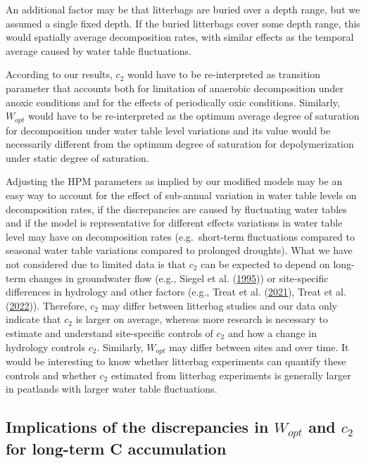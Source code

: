 \documentclass[
  12pt,
]{article}
\begin{document}
An additional factor may be that litterbags are buried over a depth range, but we assumed a single fixed depth. If the buried litterbags cover some depth range, this would spatially average decomposition rates, with similar effects as the temporal average caused by water table fluctuations.

According to our results, \(c_2\) would have to be re-interpreted as transition parameter that accounts both for limitation of anaerobic decomposition under anoxic conditions and for the effects of periodically oxic conditions. Similarly, \(W_{opt}\) would have to be re-interpreted as the optimum average degree of saturation for decomposition under water table level variations and its value would be necessarily different from the optimum degree of saturation for depolymerization under static degree of saturation.

Adjusting the HPM parameters as implied by our modified models may be an easy way to account for the effect of sub-annual variation in water table levels on decomposition rates, if the discrepancies are caused by fluctuating water tables and if the model is representative for different effects variations in water table level may have on decomposition rates (e.g.~short-term fluctuations compared to seasonal water table variations compared to prolonged droughts). What we have not considered due to limited data is that \(c_2\) can be expected to depend on long-term changes in groundwater flow (e.g., Siegel et al. (\protect\hyperlink{ref-Siegel.1995}{1995})) or site-specific differences in hydrology and other factors (e.g., Treat et al. (\protect\hyperlink{ref-Treat.2021}{2021}), Treat et al. (\protect\hyperlink{ref-Treat.2022}{2022})). Therefore, \(c_2\) may differ between litterbag studies and our data only indicate that \(c_2\) is larger on average, whereas more research is necessary to estimate and understand site-specific controls of \(c_2\) and how a change in hydrology controls \(c_2\). Similarly, \(W_{opt}\) may differ between sites and over time. It would be interesting to know whether litterbag experiments can quantify these controls and whether \(c_2\) estimated from litterbag experiments is generally larger in peatlands with larger water table fluctuations.

\hypertarget{out-discussion-5}{%
\subsection{\texorpdfstring{Implications of the discrepancies in \(W_{opt}\) and \(c_2\) for long-term C accumulation}{Implications of the discrepancies in W\_\{opt\} and c\_2 for long-term C accumulation}}\label{out-discussion-5}}
\end{document}
